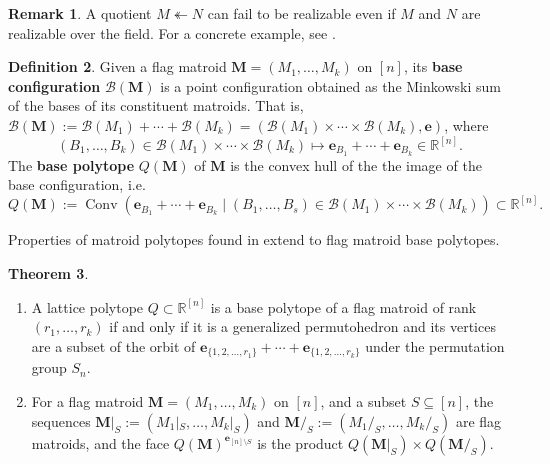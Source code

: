 \documentclass[11pt]{amsart}
\newcommand{\RR}{\mathbb R}
\newcommand{\bb}{\mathcal B}
\newcommand{\be}{\mathbf e}
\newcommand{\MM}{{\boldsymbol M}}
\theoremstyle{definition}
\newtheorem{thm}{Theorem}[subsection]
\newtheorem{defn}[thm]{Definition}
\newtheorem{rem}[thm]{Remark}
\begin{document}
\begin{rem}\label{rem:nonreal}
A quotient $M \twoheadleftarrow N$ can fail to be realizable even if $M$ and $N$ are realizable over the field.  For a concrete example, see \cite[\S1.7.5.\ Example\ 7]{BGW03}.
\end{rem}

\begin{defn}\label{defn:baseflagmat}
Given a flag matroid $\MM = (M_1, \ldots, M_k)$ on $[n]$, its \textbf{base configuration} $\bb(\MM)$ is a point configuration obtained as the Minkowski sum of the bases of its constituent matroids.  That is, $\bb(\MM) := \bb(M_1) + \cdots +\bb(M_k) = (\bb(M_1) \times \cdots \times \bb(M_k), \be)$, where
\[
(B_1, \ldots, B_k)\in \bb(M_1) \times \cdots \times \bb(M_k)\mapsto \be_{B_1} + \cdots +\be_{B_k} \in \RR^{[n]}.
\]
The \textbf{base polytope} $Q(\MM)$ of $\MM$ is the convex hull of the the image of the base configuration, i.e.\
\[
Q(\MM) := \operatorname{Conv}(\be_{B_1} + \cdots + \be_{B_k} \mid (B_1,\ldots,B_s) \in \bb(M_1)\times \cdots \times \bb(M_k)) \subset \mathbb{R}^{[n]}.
\]
\end{defn}


Properties of matroid polytopes found in  extend to flag matroid base polytopes.

\begin{thm}\label{thm:GGMSmore}\
\begin{enumerate}
\item \cite[Theorem 1.11.1]{BGW03} A lattice polytope $Q\subset \RR^{[n]}$ is a base polytope of a flag matroid of rank $(r_1, \ldots, r_k)$ if and only if it is a generalized permutohedron and its vertices are a subset of the orbit of $\be_{\{1,2,\ldots, r_1\}} + \cdots + \be_{\{1,2,\ldots, r_k\}}$ under the permutation group $S_n$.
\item For a flag matroid $\MM = (M_1, \ldots, M_k)$ on $[n]$, and a subset $S\subseteq [n]$, the sequences $\MM|_S := (M_1|_S, \ldots, M_k|_S)$ and $\MM/_S := (M_1/_S, \ldots, M_k/_S)$ are flag matroids, and the face $Q(\MM)^{\be_{[n]\setminus S}}$ is the product $Q(\MM|_S)\times Q(\MM/_S)$.
\end{enumerate}
\end{thm}
\end{document}
